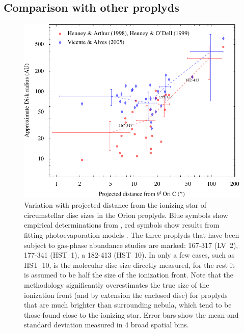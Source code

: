 \documentclass[useAMS,usenatbib]{mn2e}
\begin{document}
\subsection{Comparison with other proplyds}
\begin{figure}
  \centering
  \includegraphics[width=\linewidth]{prop-size-2012}
  \caption{Variation with projected distance from the ionizing star of circumstellar disc sizes in the Orion proplyds.   Blue symbols show empirical determinations from \citet{Vicente:2005}, red symbols show results from fitting photoevaporation models \citep{Henney:1998, 1999AJ....118.2350H}.   The three proplyds that have been subject to gas-phase abundance studies are marked: 167-317 (LV~2), 177-341 (HST~1), a 182-413 (HST~10).   In only a few cases, such as HST~10, is the molecular disc size directly measured, for the rest it is assumed to be half the size of the ionization front.   Note that the \citeauthor{Vicente:2005} methodology significantly overestimates the true size of the ionization front (and by extension the enclosed disc) for proplyds that are much brighter than surrounding nebula, which tend to be those found close to the ionizing star.   Error bars show the mean and standard deviation measured in 4 broad spatial bins.}
  \label{fig:sizes}
\end{figure}
\end{document}
